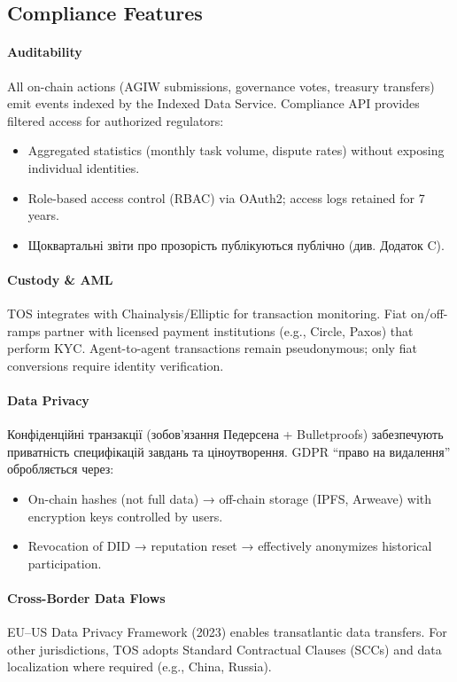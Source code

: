 \documentclass[11pt]{article}
\begin{document}
\subsection{Compliance Features}

\paragraph{Auditability}
All on-chain actions (AGIW submissions, governance votes, treasury transfers) emit events indexed by the Indexed Data Service. Compliance API provides filtered access for authorized regulators:
\begin{itemize}[noitemsep]
  \item Aggregated statistics (monthly task volume, dispute rates) without exposing individual identities.
  \item Role-based access control (RBAC) via OAuth2; access logs retained for 7 years.
  \item Щоквартальні звіти про прозорість публікуються публічно (див. Додаток C).
\end{itemize}

\paragraph{Custody \& AML}
TOS integrates with Chainalysis/Elliptic for transaction monitoring. Fiat on/off-ramps partner with licensed payment institutions (e.g., Circle, Paxos) that perform KYC. Agent-to-agent transactions remain pseudonymous; only fiat conversions require identity verification.

\paragraph{Data Privacy}
Конфіденційні транзакції (зобов'язання Педерсена + Bulletproofs) забезпечують приватність специфікацій завдань та ціноутворення. GDPR ``право на видалення'' обробляється через:
\begin{itemize}[noitemsep]
  \item On-chain hashes (not full data) → off-chain storage (IPFS, Arweave) with encryption keys controlled by users.
  \item Revocation of DID → reputation reset → effectively anonymizes historical participation.
\end{itemize}

\paragraph{Cross-Border Data Flows}
EU--US Data Privacy Framework (2023) enables transatlantic data transfers. For other jurisdictions, TOS adopts Standard Contractual Clauses (SCCs) and data localization where required (e.g., China, Russia).
\end{document}
